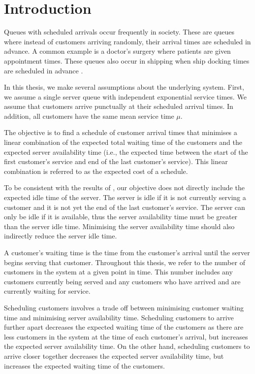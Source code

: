 \chapter{Introduction}
Queues with scheduled arrivals occur frequently in society. These are queues where instead of customers arriving randomly, their arrival times are scheduled in advance. A common example is a doctor's surgery where patients are given appointment times. These queues also occur in shipping when ship docking times are scheduled in advance \citep{Wang2}.

In this thesis, we make several assumptions about the underlying system. First, we assume a single server queue with independent exponential service times. We assume that customers arrive punctually at their scheduled arrival times. In addition, all customers have the same mean service time $\mu$.

The objective is to find a schedule of customer arrival times that minimises a linear combination of the expected total waiting time of the customers and the expected server availability time (i.e., the expected time between the start of the first customer's service and end of the last customer's service). This linear combination is referred to as the expected cost of a schedule.

To be consistent with the results of \citet{Pegden}, our objective does not directly include the expected idle time of the server. The server is idle if it is not currently serving a customer and it is not yet the end of the last customer's service. The server can only be idle if it is available, thus the server availability time must be greater than the server idle time. Minimising the server availability time should also indirectly reduce the server idle time.

A customer's waiting time is the time from the customer's arrival until the server begins serving that customer. Throughout this thesis, we refer to the number of customers in the system at a given point in time. This number includes any customers currently being served and any customers who have arrived and are currently waiting for service.

Scheduling customers involves a trade off between minimising customer waiting time and minimising server availability time. Scheduling customers to arrive further apart decreases the expected waiting time of the customers as there are less customers in the system at the time of each customer's arrival, but increases the expected server availability time. On the other hand, scheduling customers to arrive closer together decreases the expected server availability time, but increases the expected waiting time of the customers.

